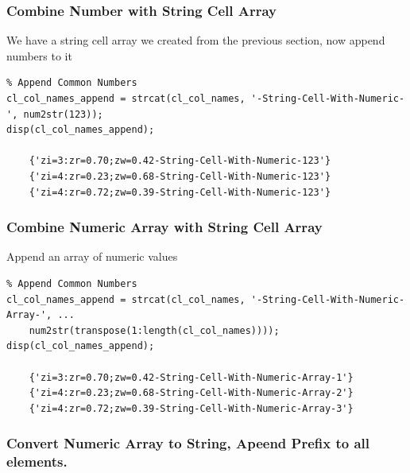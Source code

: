 \documentclass[
]{book}
\begin{document}
\hypertarget{combine-number-with-string-cell-array}{%
\subsubsection{Combine Number with String Cell Array}\label{combine-number-with-string-cell-array}}

We have a string cell array we created from the previous section, now
append numbers to it

\begin{verbatim}
% Append Common Numbers
cl_col_names_append = strcat(cl_col_names, '-String-Cell-With-Numeric-', num2str(123));
disp(cl_col_names_append);

    {'zi=3:zr=0.70;zw=0.42-String-Cell-With-Numeric-123'}
    {'zi=4:zr=0.23;zw=0.68-String-Cell-With-Numeric-123'}
    {'zi=4:zr=0.72;zw=0.39-String-Cell-With-Numeric-123'}
\end{verbatim}

\hypertarget{combine-numeric-array-with-string-cell-array}{%
\subsubsection{Combine Numeric Array with String Cell Array}\label{combine-numeric-array-with-string-cell-array}}

Append an array of numeric values

\begin{verbatim}
% Append Common Numbers
cl_col_names_append = strcat(cl_col_names, '-String-Cell-With-Numeric-Array-', ...
    num2str(transpose(1:length(cl_col_names))));
disp(cl_col_names_append);

    {'zi=3:zr=0.70;zw=0.42-String-Cell-With-Numeric-Array-1'}
    {'zi=4:zr=0.23;zw=0.68-String-Cell-With-Numeric-Array-2'}
    {'zi=4:zr=0.72;zw=0.39-String-Cell-With-Numeric-Array-3'}
\end{verbatim}

\hypertarget{convert-numeric-array-to-string-apeend-prefix-to-all-elements.}{%
\subsubsection{Convert Numeric Array to String, Apeend Prefix to all elements.}\label{convert-numeric-array-to-string-apeend-prefix-to-all-elements.}}
\end{document}
